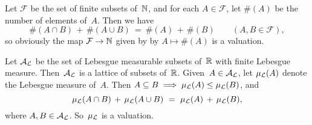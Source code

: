 \documentclass[main.tex]{subfiles}
\begin{document}
\begin{ex}
Let $\mathcal{F}$ be the set of finite subsets of~$\mathbb{N}$,
and for each $A\in \mathcal{F}$,
let $\#(A)$ be the number of elements of~$A$.
Then we have 
\begin{equation*}
\#(A\cap B) \,+\, \#(A\cup B) \ =\ \#(A) \,+\, \#(B)
\qquad(A,B\in\mathcal{F}),
\end{equation*}
so obviously the map $\mathcal{F} \rightarrow \mathbb{N}$
given by by $A\mapsto \#(A)$ is a valuation.
\end{ex}

%
%
\begin{ex}
\label{E:lmeas-val}
Let $\mathcal{A}_{\mathcal{L}}$ be the set of Lebesgue measurable
subsets of~$\mathbb{R}$ with finite Lebesgue measure.
Then~$\mathcal{A}_{\mathcal{L}}$ is a lattice of subsets of~$\mathbb{R}$.
Given~$A\in\mathcal{A}_{\mathcal{L}}$,
let $\mu_{\mathcal{L}}(A)$ denote the Lebesgue measure of~$A$.
Then $A\subseteq B \implies \mu_{\mathcal{L}}(A)\leq \mu_{\mathcal{L}} (B)$,
and 
\begin{equation*}
\mu_{\mathcal{L}}(A\cap B) \,+\, \mu_{\mathcal{L}}(A\cup B) \ =\  \mu_{\mathcal{L}}(A) \,+\, \mu_{\mathcal{L}}(B),
\end{equation*}
where $A,B\in \mathcal{A}_{\mathcal{L}}$.
So~$\mu_{\mathcal{L}}$ is a valuation.
\end{ex}
\end{document}

